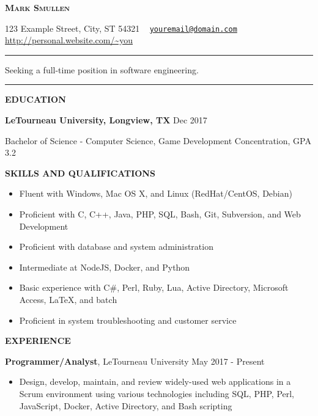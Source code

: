 \documentclass[letterpaper]{article}
\newcommand{\titlename}[1]{\centerline{\huge \bfseries{\scshape{#1}}}}
\newcommand{\contactinfo}[1]{\centerline{\small #1}}
\renewcommand{\section}[1]{\bigskip\noindent\textbf{#1}\smallskip}
\newcommand{\entry}[3]{\textbf{#1}, #2\begin{itemize}[leftmargin=3.5em]#3\end{itemize}\bigskip}
\begin{document}
\titlename{Mark Smullen}
\contactinfo{%
    123 Example Street, City, ST 54321 \textperiodcentered \ %
    \href{mailto:youremail@domain.com}{\nolinkurl{youremail@domain.com}} \textperiodcentered \ %
    \url{http://personal.website.com/~you} \textperiodcentered \ %
    \phonenumber[country=US]{0123456789}%
}
\vspace{2mm}
\hrule
\vspace{2mm}
\centerline{Seeking a full-time position in software engineering.}
\vspace{2mm}
\hrule

\section{EDUCATION}

\textbf{LeTourneau University, Longview, TX}                            \hfill          Dec 2017

Bachelor of Science - Computer Science, Game Development Concentration, GPA 3.2


\section{SKILLS AND QUALIFICATIONS}

\begin{multicols}{2}
\begin{itemize}[leftmargin=3.5em]
    \item Fluent with Windows, Mac OS X, and Linux (RedHat/CentOS, Debian)
    \item Proficient with C, C++, Java, PHP, SQL, Bash, Git, Subversion, and Web Development
    \item Proficient with database and system administration
    \item Intermediate at NodeJS, Docker, and Python
    \item Basic experience with C\#, Perl, Ruby, Lua, Active Directory, Microsoft Access, \LaTeX{}, and batch
    \item Proficient in system troubleshooting and customer service
\end{itemize}
\end{multicols}

\section{EXPERIENCE}

\entry{Programmer/Analyst}{LeTourneau University                 \hfill          May 2017 - Present} {
    \item Design, develop, maintain, and review widely-used web applications in a Scrum environment using various technologies including SQL, PHP, Perl, JavaScript, Docker, Active Directory, and Bash scripting
}
\end{document}
